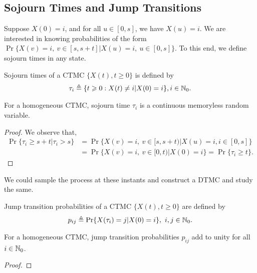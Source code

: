 \documentclass[a4paper,10pt,english]{article}
\begin{document}
\subsection{Sojourn Times and Jump Transitions}
Suppose $X(0)=i$, and  for all $u \in [0,s]$, we have $X(u)=i$. We are interested in knowing probabilities of the form $\Pr\{X(v)=i,~v \in [s,s+t] | X(u)=i, ~ u \in [0,s]\}$. To this end, we define sojourn times in any state.
\begin{defn}
Sojourn times of a CTMC $\{X(t), t \geqslant 0\}$ is defined by
\begin{align*}
\tau_i \triangleq \{t \geqslant 0: X(t) \neq i|X(0)=i\}, i \in \mathbb{N}_0. 
\end{align*}
\end{defn}
\begin{lem}
For a homogeneous CTMC, sojourn time $\tau_i$ is a continuous memoryless random variable. %
\end{lem}
\begin{proof}
We observe that,
\begin{align*}
\Pr\{\tau_i \geqslant s+t | \tau_i > s\} &=\Pr\{X(v)=i,~v \in [s,s+t) | X(u)=i,  i \in [0, s]\}\\
&= \Pr\{X(v)=i,~v \in [0,t) | X(0)=i\} = \Pr\{\tau_i \geqslant t \}.
\end{align*}
\end{proof}
We could sample the process at these instants and construct a DTMC and study the same. 
\begin{defn}
Jump transition probabilities of a CTMC $\{X(t), t \geqslant 0\}$ are defined by
\begin{align*}
p_{ij} \triangleq \Pr\{X(\tau_i)  = j | X(0) =  i \}, ~i,j \in \mathbb{N}_0.
\end{align*}
\end{defn}
\begin{lem}
For a homogeneous CTMC, jump transition probabilities $p_{ij}$ add to unity for all $i \in \mathbb{N}_0$.
\end{lem}
\begin{proof}
\end{proof}
\end{document}
